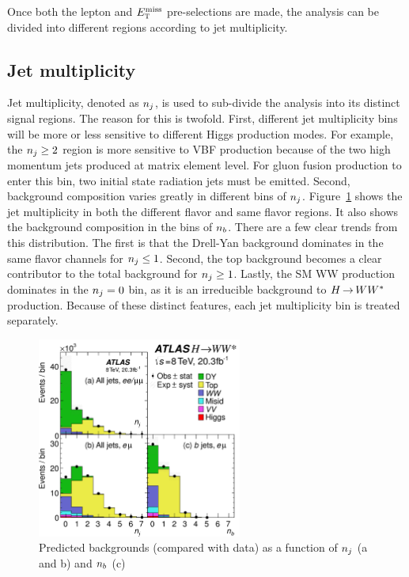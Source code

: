 Once both the lepton and $E_{\textrm{\footnotesize\sc t}}^{\rm miss}$ pre-selections are made, the analysis can be divided into different regions according to jet multiplicity.

\subsection{Jet multiplicity}
\label{sec:jetmult}
Jet multiplicity, denoted as $n_j$, is used to sub-divide the analysis into its distinct signal regions. The reason for this is twofold. First, different jet multiplicity bins will be more or less sensitive to different Higgs production modes. For example, the $n_j \geq 2$ region is more sensitive to VBF production because of the two high momentum jets produced at matrix element level. For gluon fusion production to enter this bin, two initial state radiation jets must be emitted. Second, background composition varies greatly in different bins of $n_j$. Figure~\ref{fig:njet} shows the jet multiplicity in both the different flavor and same flavor regions. It also shows the background composition in the bins of $n_b$. There are a few clear trends from this distribution. The first is that the Drell-Yan background dominates in the same flavor channels for $n_j \leq 1$. Second, the top background becomes a clear contributor to the total background for $n_j \geq 1$. Lastly, the SM WW production dominates in the $n_j = 0$ bin, as it is an irreducible background to $H{\,{\rightarrow}\,}WW^\ast$ production. Because of these distinct features, each jet multiplicity bin is treated separately.

\begin{figure}[h!]
  \centering
  \captionsetup{justification=centering}

  \includegraphics[width=0.6\textwidth]{figures/njet}
  \caption{Predicted backgrounds (compared with data) as a function of $n_j$ (a and b) and $n_b$ (c)}
  \label{fig:njet}
\end{figure}

